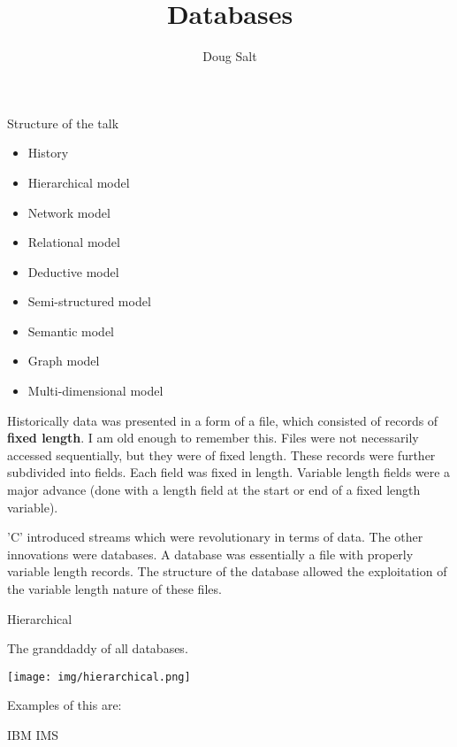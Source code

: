 \documentclass[usenames,dvipsnames,10pt]{beamer}
\title{Databases}
\author{Doug Salt}
\institute{The James Hutton Institute}
\begin{document}
\begin{frame}[plain]
    \maketitle
\end{frame}

\begin{frame}{Structure of the talk}

    \begin{itemize}
        \item History
        \item Hierarchical model
        \item Network model
        \item Relational model
        \item Deductive model
        \item Semi-structured model
        \item Semantic model
        \item Graph model
        \item Multi-dimensional model
    \end{itemize}

\end{frame}

\begin{frame}

    \vspace
    Historically data was presented in a form of a file, which consisted of records of \textbf{fixed length}. I am old enough to remember this. Files were not necessarily accessed sequentially, but they were of fixed length. These records were further subdivided into fields. Each field was fixed in length. Variable length fields were a major advance (done with a length field at the start or end of a fixed length variable). 

    \vspace
    'C' introduced streams which were revolutionary in terms of data.
    \vspace
    The other innovations were databases. A database was essentially a file with properly variable length records. The structure of the database allowed the exploitation of the variable length nature of these files.
    \vspace



\end{frame}
\begin{frame}{Hierarchical}

    \vfill

    The granddaddy of all databases.

    \vfill

    \texttt{[image: img/hierarchical.png]}

    \vfill

    Examples of this are:

    \vfill


    IBM IMS
\end{frame}
\end{document}
